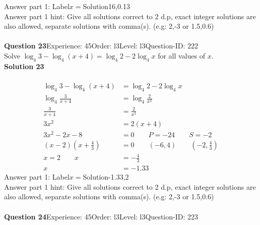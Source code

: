 \documentclass{article}
\begin{document}
Answer part 1: \hspace{10pt}Label\hspace{10pt}$x=$\hspace{10pt}Solution\hspace{10pt}16,0.13\\
Answer part 1 hint: \hspace{15pt}Give all solutions correct to 2 d.p, exact integer solutions are also allowed, separate solutions with comma(s). (e.g: 2,-3 or 1.5,0.6)\\
\\[4pt]
\noindent\textbf{Question 23}\hspace{20pt}Experience: 45\hspace{20pt}Order: l3\hspace{20pt}Level: l3\hspace{20pt}Question-ID: 222\\[2pt]
Solve $\log_{4}3-\log_{4}(x+4)=\log_{4}2-2\log_{4}x$ for all values of $x$.\\[4pt]
\noindent\textbf{Solution 23}\\[2pt]
\\[-35pt]\begin{align*}
\log_{4}3-\log_{4}(x+4)&=\log_{4}2-2\log_{4}x\\[2pt]
\log_{4}\displaystyle\frac{3}{x+4}&=\log_{4}\displaystyle\frac{2}{x^2}\\[2pt]
\displaystyle\frac{3}{x+4}&=\displaystyle\frac{2}{x^2}\\[2pt]
3x^2&=2(x+4)\\[2pt]
3x^2-2x-8&=0\qquad P=-24\qquad S=-2\\[2pt]
(x-2)\left(x+\displaystyle\frac{4}{3}\right)&=0\qquad (-6,4)\qquad \left(-2,\displaystyle\frac{4}{3}\right)\\[2pt]
x=2\qquad x&=-\displaystyle\frac{4}{3}\\[2pt]
x&=-1.33
\end{align*}
Answer part 1: \hspace{10pt}Label\hspace{10pt}$x=$\hspace{10pt}Solution\hspace{10pt}-1.33,2\\
Answer part 1 hint: \hspace{15pt} Give all solutions correct to 2 d.p, exact integer solutions are also allowed, separate solutions with comma(s). (e.g: 2,-3 or 1.5,0.6)\\
\\[4pt]
\noindent\textbf{Question 24}\hspace{20pt}Experience: 45\hspace{20pt}Order: l3\hspace{20pt}Level: l3\hspace{20pt}Question-ID: 223\\[2pt]
\end{document}

